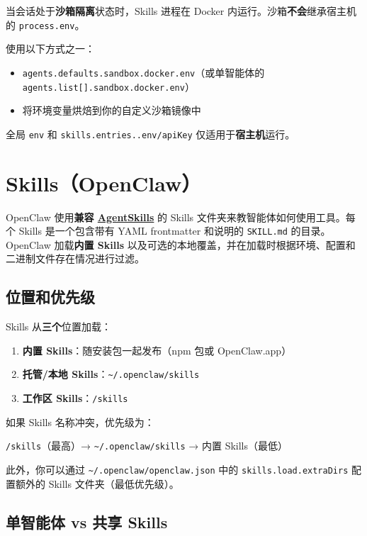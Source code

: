 当会话处于\textbf{沙箱隔离}状态时，Skills 进程在 Docker 内运行。沙箱\textbf{不会}继承宿主机的 \texttt{process.env}。

使用以下方式之一：

\begin{itemize}
  \item \texttt{agents.defaults.sandbox.docker.env}（或单智能体的 \texttt{agents.list[].sandbox.docker.env}）
  \item 将环境变量烘焙到你的自定义沙箱镜像中
\end{itemize}


全局 \texttt{env} 和 \texttt{skills.entries..env/apiKey} 仅适用于\textbf{宿主机}运行。


\clearpage

\section{Skills（OpenClaw）}


OpenClaw 使用\textbf{兼容 \href{https://agentskills.io}{AgentSkills}} 的 Skills 文件夹来教智能体如何使用工具。每个 Skills 是一个包含带有 YAML frontmatter 和说明的 \texttt{SKILL.md} 的目录。OpenClaw 加载\textbf{内置 Skills} 以及可选的本地覆盖，并在加载时根据环境、配置和二进制文件存在情况进行过滤。

\subsection{位置和优先级}


Skills 从\textbf{三个}位置加载：

\begin{enumerate}
  \item \textbf{内置 Skills}：随安装包一起发布（npm 包或 OpenClaw.app）
  \item \textbf{托管/本地 Skills}：\texttt{\textasciitilde{}/.openclaw/skills}
  \item \textbf{工作区 Skills}：\texttt{/skills}
\end{enumerate}


如果 Skills 名称冲突，优先级为：

\texttt{/skills}（最高）→ \texttt{\textasciitilde{}/.openclaw/skills} → 内置 Skills（最低）

此外，你可以通过 \texttt{\textasciitilde{}/.openclaw/openclaw.json} 中的 \texttt{skills.load.extraDirs} 配置额外的 Skills 文件夹（最低优先级）。

\subsection{单智能体 vs 共享 Skills}


